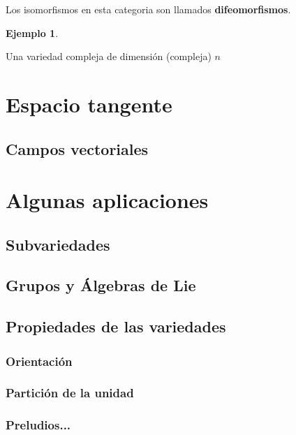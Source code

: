 \documentclass[12pt]{book}
\newtheorem{eje}{Ejemplo}
\begin{document}
Los isomorfismos en esta categoria son llamados \textbf{difeomorfismos}.

\begin{eje}
	
\end{eje}

Una variedad compleja de dimensión (compleja) $n$ 





\chapter{Espacio tangente}

\section{Campos vectoriales}





\chapter{Algunas aplicaciones}

\section{Subvariedades}

\section{Grupos y Álgebras de Lie}


\section{Propiedades de las variedades}

\subsection{Orientación}

\subsection{Partición de la unidad}

\subsection{Preludios...}
\end{document}
